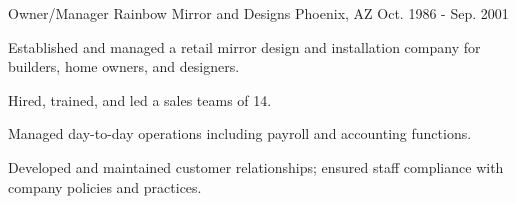 \begin{cventries}

\cventry
{Owner/Manager} %
{Rainbow Mirror and Designs} %
{Phoenix, AZ} %
{Oct. 1986 - Sep. 2001} %
{ %
\begin{cvitems}
\item {Established and managed a retail mirror design and installation company for builders, home owners, and designers.}
\item{Hired, trained, and led a sales teams of 14.}
\item{Managed day-to-day operations including payroll and accounting functions.}
\item {Developed and maintained customer relationships; ensured staff compliance with company policies and practices.}
\end{cvitems}
}




\end{cventries}